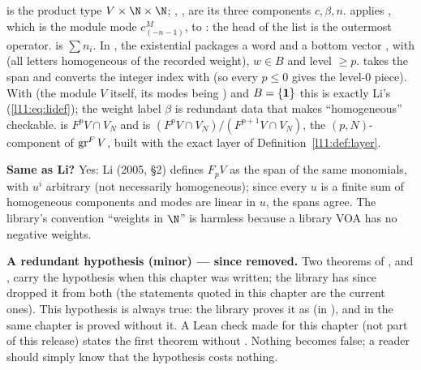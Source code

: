 \begin{dictionary}
 is the product type $V\times\N\times\N$; , ,  are its
three components $c,\beta,n$.  applies \allowbreak{}\allowbreak{}\allowbreak{}\allowbreak{},
which is the module mode $c^M_{(-n-1)}$, to : the head of the list is the outermost
operator.  is $\sum n_i$. In , the existential packages a word 
and a bottom vector , with  (all letters homogeneous of the recorded weight), $w\in
B$ and level $\ge p$.  takes the span and converts the integer index with  (so
every $p\le0$ gives the level-$0$ piece). With  (the module $V$ itself, its
modes being ) and $B = \{\mathbf{1}\}$ this is exactly Li's (\ref{l11:eq:lidef}); the
weight label $\beta$ is redundant data that makes ``homogeneous'' checkable.  is
$F^pV\cap V_N$ and  is $(F^pV\cap V_N)/(F^{p+1}V\cap V_N)$, the
$(p,N)$-component of $\operatorname{gr}^FV$, built with the exact layer of Definition~\ref{l11:def:layer}.

\textbf{Same as Li?} Yes: Li (2005, §2) defines $F_pV$ as the span of the same
monomials, with $u^i$ arbitrary (not necessarily homogeneous); since every $u$ is a finite sum of
homogeneous components and modes are linear in $u$, the spans agree. The library's convention ``weights
in $\N$'' is harmless because a library VOA has no negative weights.
\end{dictionary}

\begin{warning}
\textbf{A redundant hypothesis (minor) --- since removed.} Two theorems of
,
\allowbreak{}\allowbreak{}\allowbreak{} and \allowbreak{}\allowbreak{}\allowbreak{}\allowbreak{}, carry the
hypothesis  when this chapter was written; the library
has since dropped it from both (the statements quoted in this chapter are the current ones). This hypothesis is always
true: the library proves it as  (in
), and in the same chapter
\allowbreak{}\allowbreak{}\allowbreak{} is proved without it. A Lean check made for this chapter (not part of this release)
states the first theorem without . Nothing
becomes false; a reader should simply know that the hypothesis costs nothing.
\end{warning}

